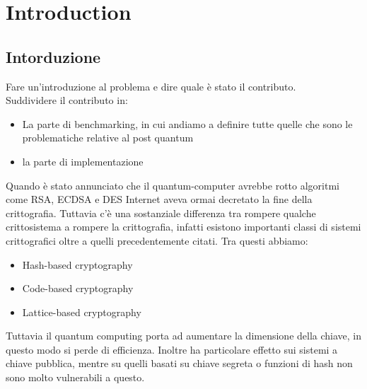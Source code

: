 
\chapter{Introduction} 

\label{Chapter1}  


\newcommand{\keyword}[1]{\textbf{#1}}
\newcommand{\tabhead}[1]{\textbf{#1}}
\newcommand{\code}[1]{\texttt{#1}}
\newcommand{\file}[1]{\texttt{\bfseries#1}}
\newcommand{\option}[1]{\texttt{\itshape#1}}


\section{Intorduzione}

Fare un'introduzione al problema e dire quale è stato il contributo.\\
Suddividere il contributo in:

\begin{itemize}
	\item La parte di benchmarking, in cui andiamo a definire tutte quelle che sono le problematiche relative al post quantum 
	\item la parte di implementazione
\end{itemize}

Quando è stato annunciato che il quantum-computer avrebbe rotto algoritmi come RSA, ECDSA e DES Internet aveva ormai decretato la fine della crittografia.
Tuttavia c'è una sostanziale differenza tra rompere qualche crittosistema a rompere la crittografia, infatti esistono importanti classi di sistemi crittografici
oltre a quelli precedentemente citati. Tra questi abbiamo:

\begin{itemize}
	\item Hash-based cryptography
	\item Code-based cryptography
	\item Lattice-based cryptography
\end{itemize}

Tuttavia il quantum computing porta ad aumentare la dimensione della chiave, in questo modo si perde di efficienza. Inoltre ha particolare effetto sui sistemi a chiave
pubblica, mentre su quelli basati su chiave segreta o funzioni di hash non sono molto vulnerabili a questo.

